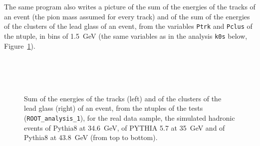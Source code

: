 The same program also writes a picture of the sum of the energies of the tracks of an event (the pion mass assumed for every track) and of the sum of the energies of the clusters of the lead glass of an event, from the variables
\texttt{Ptrk} and \texttt{Pclus} of the ntuple, in bins of 1.5~GeV (the same variables as in the analysis \texttt{k0s} below, Figure~\ref{fig:ntenergy}).
\begin{figure}[H]
\centering
{}\\[1ex]
\\[1ex]
\\[1ex]
\caption{Sum of the energies of the tracks (left) and of the clusters of the lead glass (right) of an event, from the ntuples of the tests (\texttt{ROOT\_analysis\_1}), for the real data sample, the simulated hadronic events of Pythia8 at 34.6~GeV, of PYTHIA 5.7 at 35~GeV and of Pythia8 at 43.8~GeV (from top to bottom).}
\label{fig:ntenergy}
\end{figure}
\FloatBarrier

